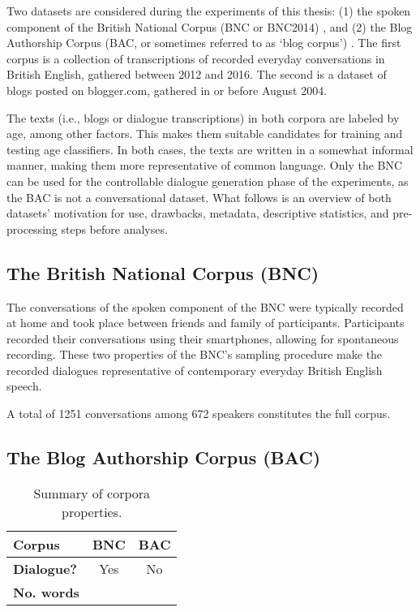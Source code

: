 Two datasets are considered during the experiments of this thesis: (1) the spoken component of the British National Corpus (BNC or BNC2014) \citep{love-spoken-bnc-2014}, and (2) the Blog Authorship Corpus (BAC, or sometimes referred to as `blog corpus') \citep{schler2006effects}. The first corpus is a collection of transcriptions of recorded everyday conversations in British English, gathered between 2012 and 2016. The second is a dataset of blogs posted on blogger.com, gathered in or before August 2004.

The texts (i.e., blogs or dialogue transcriptions) in both corpora are labeled by age, among other factors. This makes them suitable candidates for training and testing age classifiers. In both cases, the texts are written in a somewhat informal manner, making them more representative of common language. Only the BNC can be used for the controllable dialogue generation phase of the experiments, as the BAC is not a conversational dataset. What follows is an overview of both datasets' motivation for use, drawbacks, metadata, descriptive statistics, and pre-processing steps before analyses. 

\subsection{The British National Corpus (BNC)}
The conversations of the spoken component of the BNC were typically recorded at home and took place between friends and family of participants. Participants recorded their conversations using their smartphones, allowing for spontaneous recording. These two properties of the BNC's sampling procedure make the recorded dialogues representative of contemporary everyday British English speech. 

A total of 1251 conversations among 672 speakers constitutes the full corpus. 


\subsection{The Blog Authorship Corpus (BAC)}

\begin{table}[H]
    \centering
    \begin{tabular}{l | c  c}
        \hline
        \textbf{Corpus} & BNC & BAC \\
        \hline
        \textbf{Dialogue?} & Yes & No\\
        \textbf{No. words} & & \\
        \hline
    \end{tabular}
    \caption{Summary of corpora properties.}
    \label{tab:summary_corpora}
\end{table}